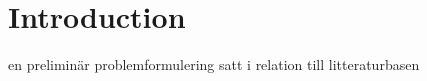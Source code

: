 \chapter{Introduction}\label{cha:intro}

en preliminär problemformulering satt i relation till litteraturbasen
